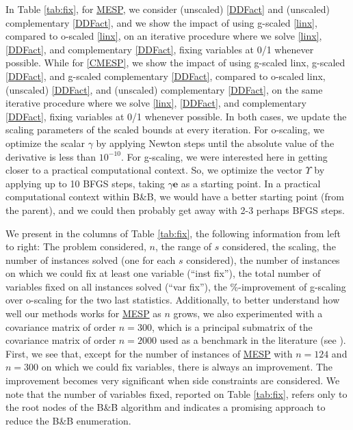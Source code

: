 \documentclass[smallextended]{svjour3hack}       %
\newcommand{\zc}[1]{\noindent{\color{red}[Zhongzhu:]\ {#1}}}
\newcommand{\mf}[1]{\noindent{\color{green}[Marcia:]\ {#1}}}
\begin{document}
{In Table \ref{tab:fix}, for \hyperlink{MESP}{MESP}, we consider  (unscaled) \ref{DDFact} and (unscaled)  complementary \ref{DDFact}, and we show the impact of using g-scaled \ref{linx}, compared to o-scaled \ref{linx}, on an iterative procedure where we solve \ref{linx}, \ref{DDFact}, and complementary \ref{DDFact}, fixing variables at 0/1 whenever possible.  While for \ref{CMESP}, we show the impact of using g-scaled linx, g-scaled \ref{DDFact},  and g-scaled complementary \ref{DDFact}, compared to o-scaled linx,  (unscaled) \ref{DDFact}, and  (unscaled) complementary \ref{DDFact}, on the same iterative procedure where we solve \ref{linx}, \ref{DDFact}, and complementary \ref{DDFact}, fixing variables at 0/1 whenever possible.
 In both cases, we update the scaling parameters of the scaled bounds at every iteration. For o-scaling, we optimize the scalar  $\gamma$ by applying Newton steps until  the absolute value of the derivative is less than $10^{-10}$. For g-scaling, we were interested here
 in getting closer to a practical computational context.
 So, we optimize the vector   $\Upsilon$ by applying up to 10 BFGS steps, taking $\gamma \mathbf{e}$ as a starting point. In a practical computational context within B\&B, we would have a better starting point (from the parent),
 and we could then probably get away with 2-3 perhaps  BFGS steps.

 We present in the columns of Table \ref{tab:fix}, the following information from left to right: The problem considered, $n$, the range of $s$ considered,
the scaling, the number of instances solved (one for each $s$ considered), the number of instances on which we could fix at least one variable (``inst fix''), the total number of variables fixed on all instances solved (``var fix''), the \%-improvement of g-scaling over o-scaling for the two last statistics. Additionally, to better understand how well our methods works for \hyperlink{MESP}{MESP} as $n$ grows, we also experimented with a covariance matrix of order $n=300$, which is a principal submatrix of the  covariance matrix of order $n=2000$ used as a benchmark in the literature (see \cite{li2020best,chen2023computing}).   First, we see that, except for the number of instances of  \hyperlink{MESP}{MESP} with $n=124$ and $n=300$ on which we could fix variables,  there is always an improvement. The improvement becomes very significant when side constraints are considered.   We note that the number of variables fixed, reported on Table \ref{tab:fix}, refers only to the root nodes of the B{\&}B algorithm and indicates a promising approach to reduce  the B{\&}B enumeration.

}
\end{document}
